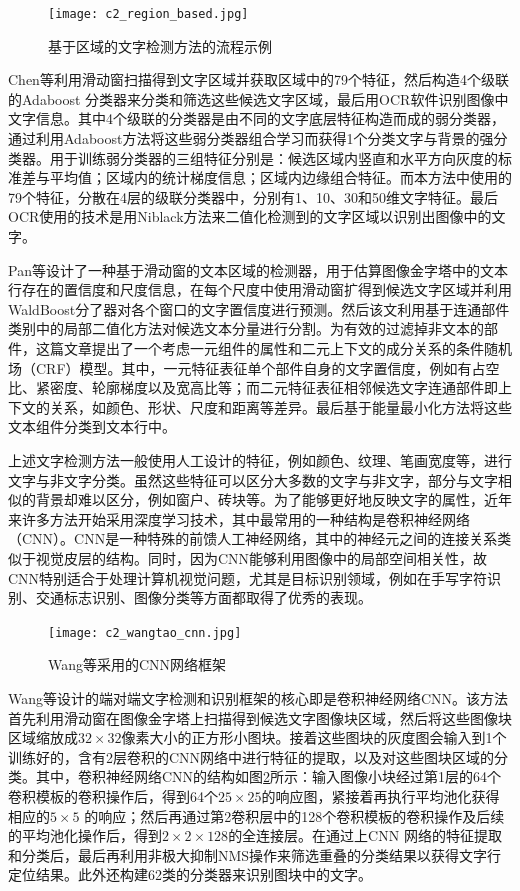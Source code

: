     \begin{figure}[!h]
    \centering
    \texttt{[image: c2\_region\_based.jpg]}
    \caption{基于区域的文字检测方法的流程示例}
    \label{fig.c2_region_based}
    \end{figure}

    Chen等\cite{Chen2004Detecting}利用滑动窗扫描得到文字区域并获取区域中的79个特征，然后构造4个级联的Adaboost 分类器来分类和筛选这些候选文字区域，最后用OCR软件识别图像中文字信息。其中4个级联的分类器是由不同的文字底层特征构造而成的弱分类器，通过利用Adaboost方法将这些弱分类器组合学习而获得1个分类文字与背景的强分类器。用于训练弱分类器的三组特征分别是：候选区域内竖直和水平方向灰度的标准差与平均值；区域内的统计梯度信息；区域内边缘组合特征。而本方法中使用的79个特征，分散在4层的级联分类器中，分别有1、10、30和50维文字特征。最后OCR使用的技术是用Niblack方法来二值化检测到的文字区域以识别出图像中的文字。

    Pan等\cite{Pan2011A}设计了一种基于滑动窗的文本区域的检测器，用于估算图像金字塔中的文本行存在的置信度和尺度信息，在每个尺度中使用滑动窗扩得到候选文字区域并利用WaldBoost分了器对各个窗口的文字置信度进行预测。然后该文利用基于连通部件类别中的局部二值化方法对候选文本分量进行分割。为有效的过滤掉非文本的部件，这篇文章提出了一个考虑一元组件的属性和二元上下文的成分关系的条件随机场（CRF）模型。其中，一元特征表征单个部件自身的文字置信度，例如有占空比、紧密度、轮廓梯度以及宽高比等；而二元特征表征相邻候选文字连通部件即上下文的关系，如颜色、形状、尺度和距离等差异。最后基于能量最小化方法将这些文本组件分类到文本行中。
    
    上述文字检测方法一般使用人工设计的特征，例如颜色、纹理、笔画宽度等，进行文字与非文字分类。虽然这些特征可以区分大多数的文字与非文字，部分与文字相似的背景却难以区分，例如窗户、砖块等。为了能够更好地反映文字的属性，近年来许多方法开始采用深度学习技术，其中最常用的一种结构是卷积神经网络（CNN）。CNN是一种特殊的前馈人工神经网络，其中的神经元之间的连接关系类似于视觉皮层的结构。同时，因为CNN能够利用图像中的局部空间相关性，故CNN特别适合于处理计算机视觉问题，尤其是目标识别领域，例如在手写字符识别、交通标志识别、图像分类等方面都取得了优秀的表现。
    
    \begin{figure}[!h]
    \centering
    \texttt{[image: c2\_wangtao\_cnn.jpg]}
    \caption{Wang等\cite{Wang2012End}采用的CNN网络框架}
    \label{fig.c2_wangtao_cnn}
    \end{figure}
    
    Wang等\cite{Wang2012End}设计的端对端文字检测和识别框架的核心即是卷积神经网络CNN。该方法首先利用滑动窗在图像金字塔上扫描得到候选文字图像块区域，然后将这些图像块区域缩放成$32\times32$像素大小的正方形小图块。接着这些图块的灰度图会输入到1个训练好的，含有2层卷积的CNN网络中进行特征的提取，以及对这些图块区域的分类。其中，卷积神经网络CNN的结构如图\ref{fig.c2_wangtao_cnn}所示：输入图像小块经过第1层的64个卷积模板的卷积操作后，得到64个$25\times25$的响应图，紧接着再执行平均池化获得相应的$5\times5$ 的响应；然后再通过第2卷积层中的128个卷积模板的卷积操作及后续的平均池化操作后，得到$2\times2\times128$的全连接层。在通过上CNN 网络的特征提取和分类后，最后再利用非极大抑制NMS操作来筛选重叠的分类结果以获得文字行定位结果。此外还构建62类的分类器来识别图块中的文字。
    
